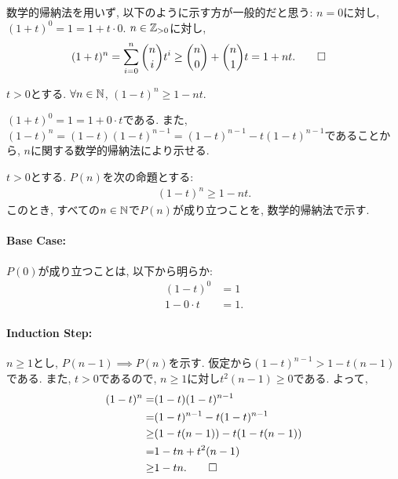 \begin{rem}
  数学的帰納法を用いず, 以下のように示す方が一般的だと思う:
  $n=0$に対し, $(1+t)^0=1=1+t\cdot0$.
  $n\in\mathbb{Z}_{>0}$に対し, 
  \begin{align*}
    (1+t)^n=
    \sum_{i=0}^n \binom{n}{i}t^i
    &\geq \binom{n}{0}+\binom{n}{1}t
    =1+nt
    .\qedhere
  \end{align*}
\end{rem}

\begin{prop}
  \label{p:20230823}
  $t>0$とする.
  $\forall n\in\mathbb{N}$,
  $(1-t)^n\geq 1-nt$.
\end{prop}
\begin{proof**}
  $(1+t)^0=1=1+0\cdot t$である.
  また, 
  $(1-t)^n=(1-t)(1-t)^{n-1}=(1-t)^{n-1}-t(1-t)^{n-1}$であることから,
  $n$に関する数学的帰納法により示せる.
\end{proof**}
\begin{proof*}
  $t>0$とする.
  $P(n)$を次の命題とする:
  \begin{align*}
    (1-t)^n\geq 1-nt
    .
  \end{align*}
  このとき,
  すべての$n\in\mathbb{N}$で$P(n)$が成り立つことを,
  数学的帰納法で示す.

  \paragraph{Base Case:}
  $P(0)$が成り立つことは, 以下から明らか:
  \begin{align*}
    (1-t)^0&=1\\
     1-0\cdot t&=1.
  \end{align*}
  \paragraph{Induction Step:}
  $n\geq 1$とし,
  $P(n-1)\implies P(n)$を示す.
  仮定から$(1-t)^{n-1}> 1-t(n-1)$である.
  また, $t>0$であるので, 
  $n\geq 1$に対し$t^2(n-1)\geq 0$である.
  よって,
  \begin{align*}
    (1-t)^n=&(1-t)(1-t)^{n-1}\\
    =&(1-t)^{n-1}-t(1-t)^{n-1}\\
    \geq&
    (1-t(n-1))-t(1-t(n-1))\\
    =&1-tn+t^2(n-1)\\
    \geq&1-tn
    .\qedhere
  \end{align*}
\end{proof*}

